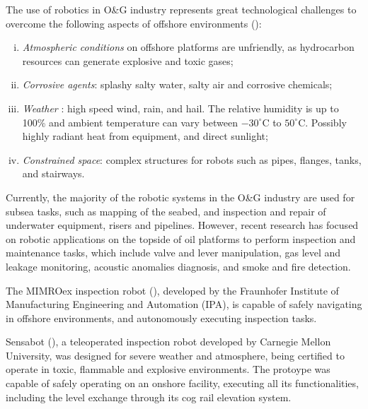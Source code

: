 \documentclass{ifacconf}
\begin{document}
The use of robotics in O\&G industry represents great technological challenges
to overcome the following aspects of offshore environments (\cite{chen}):

\begin{enumerate}[i)]
\item \emph{Atmospheric conditions} on offshore platforms are unfriendly, as
hydrocarbon resources can generate explosive and toxic gases;
\item \emph{Corrosive agents}: splashy salty water, salty air and corrosive
chemicals;
\item \emph{Weather} : high speed wind, rain, and hail. The relative humidity is
up to 100\% and ambient temperature can vary between $-30^{\circ}$C to
$50^{\circ}$C. Possibly highly radiant heat from equipment, and direct sunlight;
\item \emph{Constrained space}: complex structures for robots such as pipes,
flanges, tanks, and stairways.
\end{enumerate}

Currently, the majority of the robotic systems in the O\&G industry are used for
subsea tasks, such as mapping of the seabed, and inspection and repair of
underwater equipment, risers and pipelines. However, recent research has focused
on robotic applications on the topside of oil platforms to perform inspection
and maintenance tasks, which include valve and lever manipulation, gas level
and leakage monitoring, acoustic anomalies diagnosis, and smoke and fire
detection.

The MIMROex inspection robot (\cite{mimroex}), developed by the Fraunhofer
Institute of Manufacturing Engineering and Automation (IPA), is capable of
safely navigating in offshore environments, and autonomously executing
inspection tasks.

Sensabot (\cite{sensabot}), a teleoperated inspection robot developed by
Carnegie Mellon University, was designed for severe weather and atmosphere,
being certified to operate in toxic, flammable and explosive environments. The
protoype was capable of safely operating on an onshore facility, executing all
its functionalities, including the level exchange through its cog rail
elevation system.
\end{document}
